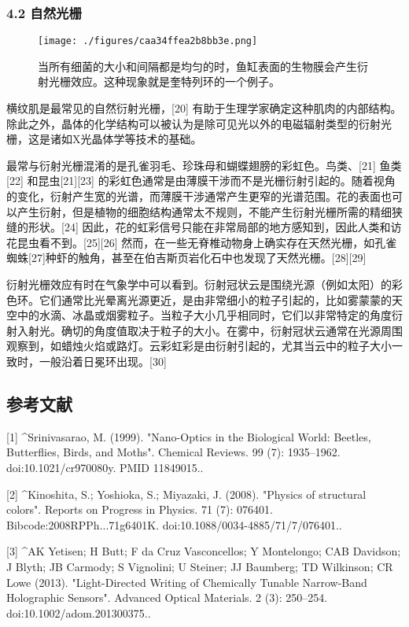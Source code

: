\subsubsection{4.2 自然光栅}
\begin{figure}[ht]
\centering
\texttt{[image: ./figures/caa34ffea2b8bb3e.png]}
\caption{当所有细菌的大小和间隔都是均匀的时，鱼缸表面的生物膜会产生衍射光栅效应。这种现象就是奎特列环的一个例子。} \label{fig_YSGS_7}
\end{figure}
横纹肌是最常见的自然衍射光栅，[20] 有助于生理学家确定这种肌肉的内部结构。除此之外，晶体的化学结构可以被认为是除可见光以外的电磁辐射类型的衍射光栅，这是诸如X光晶体学等技术的基础。

最常与衍射光栅混淆的是孔雀羽毛、珍珠母和蝴蝶翅膀的彩虹色。鸟类、[21] 鱼类[22] 和昆虫[21][23] 的彩虹色通常是由薄膜干涉而不是光栅衍射引起的。随着视角的变化，衍射产生宽的光谱，而薄膜干涉通常产生更窄的光谱范围。花的表面也可以产生衍射，但是植物的细胞结构通常太不规则，不能产生衍射光栅所需的精细狭缝的形状。[24] 因此，花的虹彩信号只能在非常局部的地方感知到，因此人类和访花昆虫看不到。[25][26] 然而，在一些无脊椎动物身上确实存在天然光栅，如孔雀蜘蛛[27]种虾的触角，甚至在伯吉斯页岩化石中也发现了天然光栅。[28][29]

衍射光栅效应有时在气象学中可以看到。衍射冠状云是围绕光源（例如太阳）的彩色环。它们通常比光晕离光源更近，是由非常细小的粒子引起的，比如雾蒙蒙的天空中的水滴、冰晶或烟雾粒子。当粒子大小几乎相同时，它们以非常特定的角度衍射入射光。确切的角度值取决于粒子的大小。在雾中，衍射冠状云通常在光源周围观察到，如蜡烛火焰或路灯。云彩虹彩是由衍射引起的，尤其当云中的粒子大小一致时，一般沿着日冕环出现。[30]

\subsection{参考文献}
[1]
^Srinivasarao, M. (1999). "Nano-Optics in the Biological World: Beetles, Butterflies, Birds, and Moths". Chemical Reviews. 99 (7): 1935–1962. doi:10.1021/cr970080y. PMID 11849015..

[2]
^Kinoshita, S.; Yoshioka, S.; Miyazaki, J. (2008). "Physics of structural colors". Reports on Progress in Physics. 71 (7): 076401. Bibcode:2008RPPh...71g6401K. doi:10.1088/0034-4885/71/7/076401..

[3]
^AK Yetisen; H Butt; F da Cruz Vasconcellos; Y Montelongo; CAB Davidson; J Blyth; JB Carmody; S Vignolini; U Steiner; JJ Baumberg; TD Wilkinson; CR Lowe (2013). "Light-Directed Writing of Chemically Tunable Narrow-Band Holographic Sensors". Advanced Optical Materials. 2 (3): 250–254. doi:10.1002/adom.201300375..

